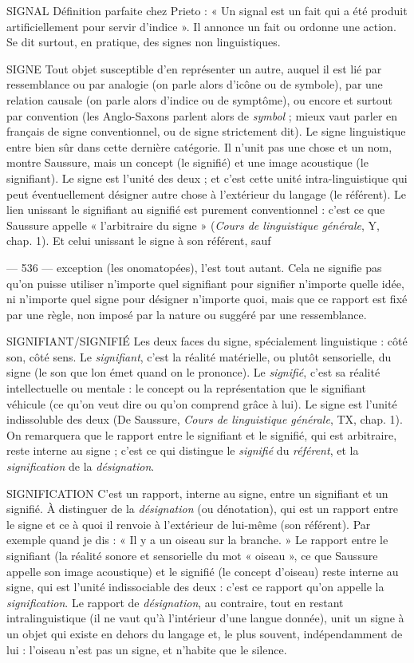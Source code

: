 SIGNAL Définition parfaite chez Prieto : « Un signal est un fait qui a été
produit artificiellement pour servir d'indice ». Il annonce un fait
ou ordonne une action. Se dit surtout, en pratique, des signes non linguistiques.

SIGNE Tout objet susceptible d’en représenter un autre, auquel il est lié par
ressemblance ou par analogie (on parle alors d’icône ou de symbole),
par une relation causale (on parle alors d’indice ou de symptôme), ou encore et
surtout par convention (les Anglo-Saxons parlent alors de {\it symbol} ; mieux vaut
parler en français de signe conventionnel, ou de signe strictement dit). Le signe
linguistique entre bien sûr dans cette dernière catégorie. Il n’unit pas une chose
et un nom, montre Saussure, mais un concept (le signifié) et une image acoustique
(le signifiant). Le signe est l’unité des deux ; et c’est cette unité intra-linguistique
qui peut éventuellement désigner autre chose à l'extérieur du langage
(le référent). Le lien unissant le signifiant au signifié est purement
conventionnel : c’est ce que Saussure appelle « l'arbitraire du signe » ({\it Cours de
linguistique générale}, Y, chap. 1). Et celui unissant le signe à son référent, sauf

— 536 —
exception (les onomatopées), l’est tout autant. Cela ne signifie pas qu’on puisse
utiliser n'importe quel signifiant pour signifier n'importe quelle idée, ni
n'importe quel signe pour désigner n’importe quoi, mais que ce rapport est fixé
par une règle, non imposé par la nature ou suggéré par une ressemblance.

SIGNIFIANT/SIGNIFIÉ Les deux faces du signe, spécialement linguistique :
côté son, côté sens. Le {\it signifiant}, c’est la réalité
matérielle, ou plutôt sensorielle, du signe (le son que lon émet quand on le
prononce). Le {\it signifié}, c’est sa réalité intellectuelle ou mentale : le concept ou la
représentation que le signifiant véhicule (ce qu’on veut dire ou qu'on comprend
grâce à lui). Le signe est l'unité indissoluble des deux (De Saussure,
{\it Cours de linguistique générale}, TX, chap. 1). On remarquera que le rapport entre
le signifiant et le signifié, qui est arbitraire, reste interne au signe ; c’est ce qui
distingue le {\it signifié} du {\it référent}, et la {\it signification} de la {\it désignation}.

SIGNIFICATION C'est un rapport, interne au signe, entre un signifiant et
un signifié. À distinguer de la {\it désignation} (ou dénotation),
qui est un rapport entre le signe et ce à quoi il renvoie à l'extérieur de lui-même
(son référent). Par exemple quand je dis : « Il y a un oiseau sur la branche. » Le
rapport entre le signifiant (la réalité sonore et sensorielle du mot « oiseau », ce
que Saussure appelle son image acoustique) et le signifié (le concept d'oiseau)
reste interne au signe, qui est l’unité indissociable des deux : c’est ce rapport
qu’on appelle la {\it signification}. Le rapport de {\it désignation}, au contraire, tout en
restant intralinguistique (il ne vaut qu’à l’intérieur d’une langue donnée), unit
un signe à un objet qui existe en dehors du langage et, le plus souvent, indépendamment
de lui : l'oiseau n’est pas un signe, et n’habite que le silence.

